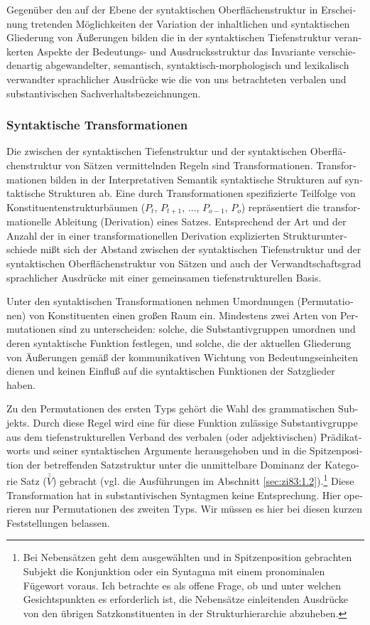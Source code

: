 \documentclass[output=paper]{langscibook}
\begin{document}
\begin{otherlanguage}{german}
Gegenüber den auf der Ebene der syntaktischen Ober\-flä\-chen\-struktur in Erscheinung tretenden Möglichkeiten der Variation der inhaltlichen und syn\-tak\-ti\-schen Gliederung von Äußerungen bilden die in der syn\-tak\-ti\-schen Tiefenstruktur verankerten Aspekte der Bedeutungs- und Ausdrucksstruktur das Invariante verschiedenartig abgewandelter, semantisch, syntaktisch-morphologisch und lexikalisch verwandter sprachlicher Ausdrücke wie die von uns betrachteten verbalen und substantivischen Sachverhaltsbezeichnungen.

\largerpage
\subsubsection{Syntaktische Transformationen}\label{sec:zi83:1.3.2}

Die zwischen der syntaktischen Tiefenstruktur und der syntaktischen Ober\-flä\-chen\-struktur von Sätzen vermittelnden Regeln sind Transformationen. Transformationen bilden in der Interpretativen Semantik syntaktische Strukturen auf syntaktische Strukturen ab. Eine durch Transformationen spezifizierte Teilfolge von Konstituentenstrukturbäumen ($P_{t}$, $P_{t+1}$, ..., $P_{o-1}$, $P_{o}$) repräsentiert die transformationelle Ableitung (Derivation) eines Satzes. Entsprechend der Art und der Anzahl der in einer transformationellen Derivation explizierten Strukturunterschiede mißt sich der Abstand zwischen der syntaktischen Tiefenstruktur und der syntaktischen Oberflächenstruktur von Sätzen und auch der Verwandtschaftsgrad sprachlicher Ausdrücke mit einer gemeinsamen tiefenstrukturellen Basis.

Unter den syntaktischen Transformationen nehmen Umordnungen (Permutationen) von Konstituenten einen großen Raum ein. Mindestens zwei Arten von Permutationen sind zu unterscheiden: solche, die Substantivgruppen umordnen und deren syntaktische Funktion festlegen, und solche, die der aktuellen Gliederung von Äußerungen gemäß der kommunikativen Wichtung von Bedeutungseinheiten dienen und keinen Einfluß auf die syntaktischen Funktionen der Satzglieder haben.

Zu den Permutationen des ersten Typs gehört die Wahl des grammatischen Subjekts. Durch diese Regel wird eine für diese Funktion zulässige Substantivgruppe aus dem tiefenstrukturellen Verband des verbalen (oder adjektivischen) Prädikatworts und seiner syntaktischen Argumente herausgehoben und in die Spitzenposition der betreffenden Satzstruktur unter die unmittelbare Dominanz der Kategorie Satz ($\bar{\bar{V}}$) gebracht (vgl. die Ausführungen im Abschnitt \ref{sec:zi83:1.2}).\footnote{Bei Nebensätzen geht dem ausgewählten und in Spitzenposition gebrachten Subjekt die Konjunktion oder ein Syntagma mit einem pronominalen Fügewort voraus. Ich betrachte es als offene Frage, ob und unter welchen Gesichtspunkten es erforderlich ist, die Nebensätze einleitenden Ausdrücke von den übrigen Satzkonstituenten in der Strukturhierarchie abzuheben.} Diese Transformation hat in substantivischen Syntagmen keine Entsprechung. Hier operieren nur Permutationen des zweiten Typs. Wir müssen es hier bei diesen kurzen Feststellungen belassen.


\end{otherlanguage}
\end{document}
